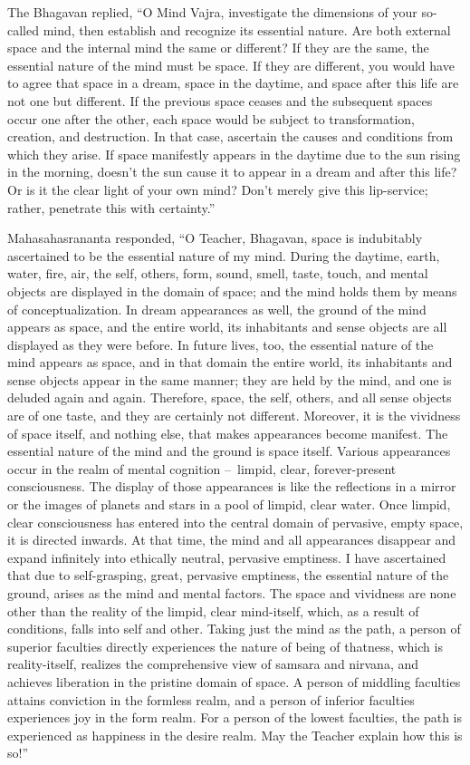 \documentclass[a4paper,11pt,twoside,final]{book}
\begin{document}
The Bhagavan replied, ``O Mind Vajra, investigate the dimensions of
your so-called mind, then establish and recognize its essential
nature. Are both external space and the internal mind the same or
different? If they are the same, the essential nature of the mind must
be space. If they are different, you would have to agree that space in
a dream, space in the daytime, and space after this life are not one
but different. If the previous space ceases and the subsequent spaces
occur one after the other, each space would be subject to
transformation, creation, and destruction. In that case, ascertain the
causes and conditions from which they arise. If space manifestly
appears in the daytime due to the sun rising in the morning, doesn't
the sun cause it to appear in a dream and after this life? Or is it
the clear light of your own mind? Don't merely give this lip-service;
rather, penetrate this with certainty.''

Mahasahasrananta responded, ``O Teacher, Bhagavan, space is
indubitably ascertained to be the essential nature of my mind. During
the daytime, earth, water, fire, air, the self, others, form, sound,
smell, taste, touch, and mental objects are displayed in the domain of
space; and the mind holds them by means of conceptualization. In dream
appearances as well, the ground of the mind appears as space, and the
entire world, its inhabitants and sense objects are all displayed as
they were before. In future lives, too, the essential nature of the
mind appears as space, and in that domain the entire world, its
inhabitants and sense objects appear in the same manner; they are held
by the mind, and one is deluded again and again.  Therefore, space,
the self, others, and all sense objects are of one taste, and they are
certainly not different. Moreover, it is the vividness of space
itself, and nothing else, that makes appearances become manifest. The
essential nature of the mind and the ground is space itself. Various
appearances occur in the realm of mental cognition --~limpid, clear,
forever-present consciousness.  The display of those appearances is
like the reflections in a mirror or the images of planets and stars in
a pool of limpid, clear water. Once limpid, clear consciousness has
entered into the central domain of pervasive, empty space, it is
directed inwards. At that time, the mind and all appearances disappear
and expand infinitely into ethically neutral, pervasive emptiness. I
have ascertained that due to self-grasping, great, pervasive
emptiness, the essential nature of the ground, arises as the mind and
mental factors. The space and vividness are none other than the
reality of the limpid, clear mind-itself, which, as a result of
conditions, falls into self and other.  Taking just the mind as the
path, a person of superior faculties directly experiences the nature
of being of thatness, which is reality-itself, realizes the
comprehensive view of samsara and nirvana, and achieves liberation in
the pristine domain of space. A person of middling faculties attains
conviction in the formless realm, and a person of inferior faculties
experiences joy in the form realm. For a person of the lowest
faculties, the path is experienced as happiness in the desire
realm. May the Teacher explain how this is so!''
\end{document}
